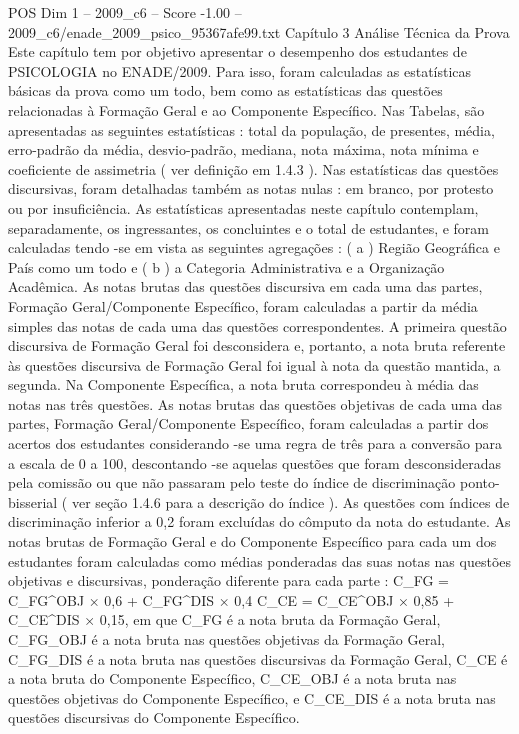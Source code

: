 \begin{textsample}{POS Dim 1 – 2009\_c6 – Score -1.00 – 2009\_c6/enade\_2009\_psico\_95367afe99.txt}  \label{ex:f1_pos_222}
Capítulo 3 Análise Técnica da Prova Este capítulo tem por objetivo apresentar o desempenho dos estudantes de PSICOLOGIA no ENADE/2009.
Para isso, foram calculadas as estatísticas básicas da prova como um todo, bem como as estatísticas das questões relacionadas à Formação Geral e ao Componente Específico.
Nas Tabelas, são apresentadas as seguintes estatísticas : total da população, de presentes, média, erro-padrão da média, desvio-padrão, mediana, nota máxima, nota mínima e coeficiente de assimetria ( ver definição em 1.4.3 ).
Nas estatísticas das questões discursivas, foram detalhadas também as notas nulas : em branco, por protesto ou por insuficiência.
As estatísticas apresentadas neste capítulo contemplam, separadamente, os ingressantes, os concluintes e o total de estudantes, e foram calculadas tendo -se em vista as seguintes agregações : ( a ) Região Geográfica e País como um todo e ( b ) a Categoria Administrativa e a Organização Acadêmica.
As notas brutas das questões discursiva em cada uma das partes, Formação Geral/Componente Específico, foram calculadas a partir da média simples das notas de cada uma das questões correspondentes.
A primeira questão discursiva de Formação Geral foi desconsidera e, portanto, a nota bruta referente às questões discursiva de Formação Geral foi igual à nota da questão mantida, a segunda.
Na Componente Específica, a nota bruta correspondeu à média das notas nas três questões.
As notas brutas das questões objetivas de cada uma das partes, Formação Geral/Componente Específico, foram calculadas a partir dos acertos dos estudantes considerando -se uma regra de três para a conversão para a escala de 0 a 100, descontando -se aquelas questões que foram desconsideradas pela comissão ou que não passaram pelo teste do índice de discriminação ponto-bisserial ( ver seção 1.4.6 para a descrição do índice ).
As questões com índices de discriminação inferior a 0,2 foram excluídas do cômputo da nota do estudante.
As notas brutas de Formação Geral e do Componente Específico para cada um dos estudantes foram calculadas como médias ponderadas das suas notas nas questões objetivas e discursivas, ponderação diferente para cada parte : C\_FG = C\_FG\textasciicircum{}OBJ × 0,6 + C\_FG\textasciicircum{}DIS × 0,4 C\_CE = C\_CE\textasciicircum{}OBJ × 0,85 + C\_CE\textasciicircum{}DIS × 0,15, em que C\_FG é a nota bruta da Formação Geral, C\_FG\_OBJ é a nota bruta nas questões objetivas da Formação Geral, C\_FG\_DIS é a nota bruta nas questões discursivas da Formação Geral, C\_CE é a nota bruta do Componente Específico, C\_CE\_OBJ é a nota bruta nas questões objetivas do Componente Específico, e C\_CE\_DIS é a nota bruta nas questões discursivas do Componente Específico.

\end{textsample}
